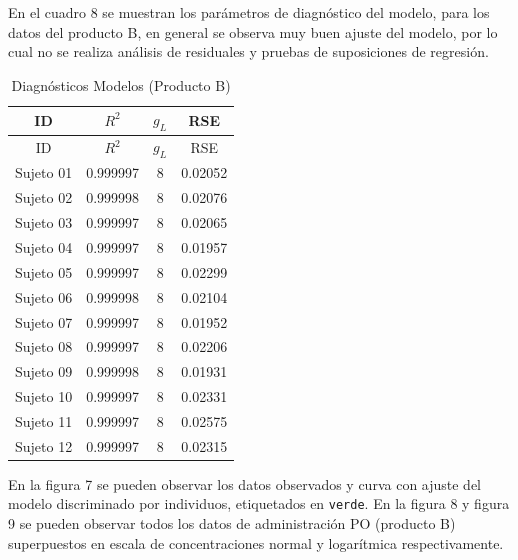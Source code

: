 \documentclass[]{article}
\begin{document}
En el cuadro 8 se muestran los parámetros de diagnóstico del modelo,
para los datos del producto B, en general se observa muy buen ajuste del
modelo, por lo cual no se realiza análisis de residuales y pruebas de
suposiciones de regresión.

\begin{longtable}[]{@{}cccc@{}}
\caption{Diagnósticos Modelos (Producto B)}\tabularnewline
\toprule
ID & \(R^{2}\) & \(g_{L}\) & RSE\tabularnewline
\midrule
\endfirsthead
\toprule
ID & \(R^{2}\) & \(g_{L}\) & RSE\tabularnewline
\midrule
\endhead
Sujeto 01 & 0.999997 & 8 & 0.02052\tabularnewline
Sujeto 02 & 0.999998 & 8 & 0.02076\tabularnewline
Sujeto 03 & 0.999997 & 8 & 0.02065\tabularnewline
Sujeto 04 & 0.999997 & 8 & 0.01957\tabularnewline
Sujeto 05 & 0.999997 & 8 & 0.02299\tabularnewline
Sujeto 06 & 0.999998 & 8 & 0.02104\tabularnewline
Sujeto 07 & 0.999997 & 8 & 0.01952\tabularnewline
Sujeto 08 & 0.999997 & 8 & 0.02206\tabularnewline
Sujeto 09 & 0.999998 & 8 & 0.01931\tabularnewline
Sujeto 10 & 0.999997 & 8 & 0.02331\tabularnewline
Sujeto 11 & 0.999997 & 8 & 0.02575\tabularnewline
Sujeto 12 & 0.999997 & 8 & 0.02315\tabularnewline
\bottomrule
\end{longtable}

En la figura 7 se pueden observar los datos observados y curva con
ajuste del modelo discriminado por individuos, etiquetados en
\texttt{verde}. En la figura 8 y figura 9 se pueden observar todos los
datos de administración PO (producto B) superpuestos en escala de
concentraciones normal y logarítmica respectivamente.
\end{document}
